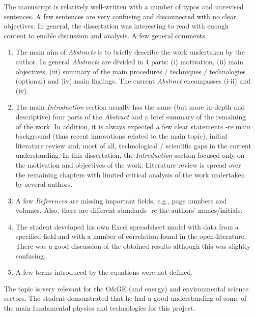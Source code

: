 \documentclass[14pt,twoside]{report}
\begin{document}
The manuscript is relatively well-written with a number of typos and unrevised sentences. A few sentences are very confusing and disconnected with no clear objectives. In general, the dissertation was interesting to read with enough content to enable discussion and analysis. A few general comments,
\begin{enumerate}
\item The main aim of {\it Abstracts} is to briefly describe the work undertaken by the author. In general {\it Abstracts} are divided in 4 parts: (i) motivation, (ii) main objectives, (iii) summary of the main procedures / techniques / technologies (optional) and (iv) main findings. The current {\it Abstract} encompasses (i-ii) and (iv).
%
\item The main {\it Introduction} section usually has the same (but more in-depth and descriptive) four parts of the {\it Abstract} and a brief summary of the remaining of the work. In addition, it is always expected a few clear statements -re main background (thus recent innovations related to the main topic), initial literature review and, most of all, technological / scientific gaps in the current understanding. In this dissertation, the {\it Introduction} section focused only on the motivation and objectives of the work. Literature review is spread over the remaining chapters with limited critical analysis of the work undertaken by several authors. 
%
\item A few {\it References} are missing important fields, e.g., page numbers and volumes. Also, there are different standards -re the authors' names/initials.
%
\item The student developed his own Excel spreadsheet model with data from a specified field and with a number of correlation found in the open-literature. There was a good discussion of the obtained results although this was slightly confusing.
%
\item A few terms introduced by the equations were not defined. 
% 
\end{enumerate}

The topic is very relevant for the O$\&$GE (and energy) and environmental science sectors. The student demonstrated that he had a good understanding of some of the main fundamental physics and technologies for this project.

\clearpage


\bigskip
\end{document}

